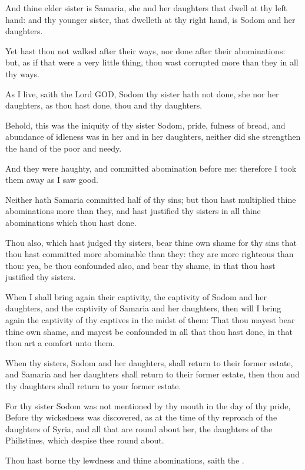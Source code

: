 \verse And thine elder sister is Samaria, she and her daughters that dwell at thy left hand: and thy younger sister, that dwelleth at thy right hand, is Sodom and her daughters.

\verse Yet hast thou not walked after their ways, nor done after their abominations: but, as if that were a very little thing, thou wast corrupted more than they in all thy ways.

\verse As I live, saith the Lord GOD, Sodom thy sister hath not done, she nor her daughters, as thou hast done, thou and thy daughters.

\verse Behold, this was the iniquity of thy sister Sodom, pride, fulness of bread, and abundance of idleness was in her and in her daughters, neither did she strengthen the hand of the poor and needy.

\verse And they were haughty, and committed abomination before me: therefore I took them away as I saw good.

\verse Neither hath Samaria committed half of thy sins; but thou hast multiplied thine abominations more than they, and hast justified thy sisters in all thine abominations which thou hast done.

\verse Thou also, which hast judged thy sisters, bear thine own shame for thy sins that thou hast committed more abominable than they: they are more righteous than thou: yea, be thou confounded also, and bear thy shame, in that thou hast justified thy sisters.

\verse When I shall bring again their captivity, the captivity of Sodom and her daughters, and the captivity of Samaria and her daughters, then will I bring again the captivity of thy captives in the midst of them: \verse That thou mayest bear thine own shame, and mayest be confounded in all that thou hast done, in that thou art a comfort unto them.

\verse When thy sisters, Sodom and her daughters, shall return to their former estate, and Samaria and her daughters shall return to their former estate, then thou and thy daughters shall return to your former estate.

\verse For thy sister Sodom was not mentioned by thy mouth in the day of thy pride, \verse Before thy wickedness was discovered, as at the time of thy reproach of the daughters of Syria, and all that are round about her, the daughters of the Philistines, which despise thee round about.

\verse Thou hast borne thy lewdness and thine abominations, saith the \LORD.

